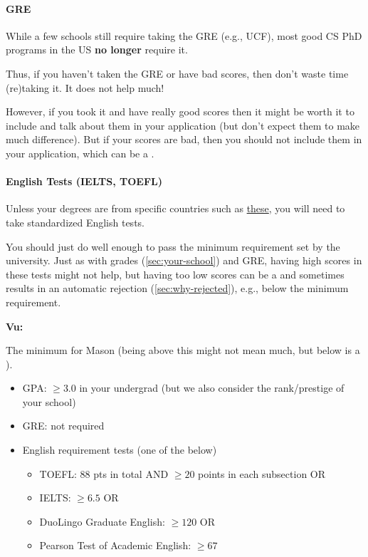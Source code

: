 \documentclass[oneside,11pt,dvipsnames]{book}
\newenvironment{commentbox}[1][]{
  \small
  \begin{mybox}
    {\small \textbf{#1}}
  }{
  \end{mybox}
}
\newcommand{\red}[1]{{\color{red}{#1}}}
\begin{document}
\paragraph{GRE} While a few schools still require taking the GRE (e.g., UCF), most good CS PhD programs in the US \textbf{no longer} require it.

Thus, if you haven't taken the GRE or have bad scores, then don't waste time (re)taking it. It does not help much!

However, if you took it and have really good scores then it might be worth it to include and talk about them in your application (but don't expect them to make much difference). But if your scores are bad, then you should not include them in your application, which can be a \red{red flag}.

\paragraph{English Tests (IELTS, TOEFL)} Unless your degrees are from specific countries such as \href{https://github.com/dynaroars/dynaroars.github.io/wiki/About-Mason#standard-tests-waiver-eligible-countries}{these}, you will need to
take standardized English tests.

You should just do well enough to pass the minimum requirement set by the university. %
Just as with grades (\autoref{sec:your-school}) and GRE, having high scores in these tests might not help, but having too low scores can be a \red{red flag} and sometimes results in an automatic rejection (\autoref{sec:why-rejected}), e.g., below the minimum requirement.


\begin{commentbox}[Vu:]
  The minimum for Mason (being above this might not mean much, but below is a \red{red flag}).
  \begin{itemize}
    \item GPA: $\ge 3.0$ in your undergrad (but we also consider the rank/prestige of your school)
    \item GRE: not required
    \item English requirement tests (one of the below)
          \begin{itemize}
            \item TOEFL: 88 pts in total AND $\ge 20$ points in each subsection OR
            \item IELTS: $\ge 6.5$ OR
            \item DuoLingo Graduate English: $\ge 120$ OR
            \item Pearson Test of Academic English: $\ge 67$
          \end{itemize}
  \end{itemize}
\end{commentbox}
\end{document}
